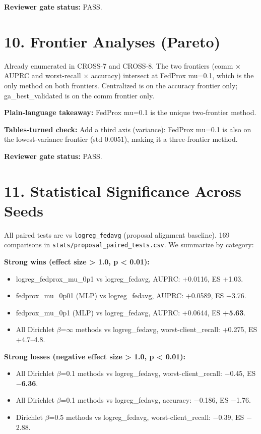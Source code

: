 \documentclass{article}
\begin{document}
\textbf{Reviewer gate status:} PASS.



\clearpage
\section{10. Frontier Analyses (Pareto)}


Already enumerated in CROSS-7 and CROSS-8. The two frontiers (comm \ensuremath{\times} AUPRC and worst-recall \ensuremath{\times} accuracy) intersect at FedProx mu=0.1, which is the only method on both frontiers. Centralized is on the accuracy frontier only; ga\_best\_validated is on the comm frontier only.


\textbf{Plain-language takeaway:} FedProx mu=0.1 is the unique two-frontier method.


\textbf{Tables-turned check:} Add a third axis (variance): FedProx mu=0.1 is also on the lowest-variance frontier (std 0.0051), making it a three-frontier method.


\textbf{Reviewer gate status:} PASS.



\clearpage
\section{11. Statistical Significance Across Seeds}


All paired tests are vs \texttt{logreg\_fedavg} (proposal alignment baseline). 169 comparisons in \texttt{stats/proposal\_paired\_tests.csv}. We summarize by category:


\textbf{Strong wins (effect size > 1.0, p < 0.01):}

\begin{itemize}[leftmargin=1.4em,itemsep=2pt,topsep=2pt]
  \item logreg\_fedprox\_mu\_0p1 vs logreg\_fedavg, AUPRC: +0.0116, ES +1.03.
  \item fedprox\_mu\_0p01 (MLP) vs logreg\_fedavg, AUPRC: +0.0589, ES +3.76.
  \item fedprox\_mu\_0p1 (MLP) vs logreg\_fedavg, AUPRC: +0.0644, ES \textbf{+5.63}.
  \item All Dirichlet \ensuremath{\beta}=\ensuremath{\infty} methods vs logreg\_fedavg, worst-client\_recall: +0.275, ES +4.7--4.8.
\end{itemize}


\textbf{Strong losses (negative effect size > 1.0, p < 0.01):}

\begin{itemize}[leftmargin=1.4em,itemsep=2pt,topsep=2pt]
  \item All Dirichlet \ensuremath{\beta}=0.1 methods vs logreg\_fedavg, worst-client\_recall: \ensuremath{-}0.45, ES \textbf{\ensuremath{-}6.36}.
  \item All Dirichlet \ensuremath{\beta}=0.1 methods vs logreg\_fedavg, accuracy: \ensuremath{-}0.186, ES \ensuremath{-}1.76.
  \item Dirichlet \ensuremath{\beta}=0.5 methods vs logreg\_fedavg, worst-client\_recall: \ensuremath{-}0.39, ES \ensuremath{-}2.88.
\end{itemize}
\end{document}
